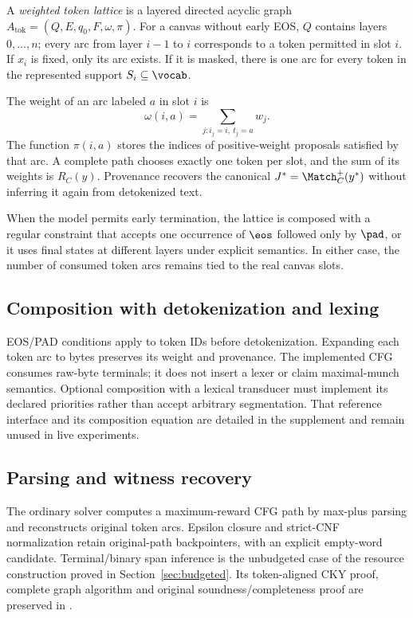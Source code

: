 A \emph{weighted token lattice} is a layered directed acyclic graph $A_{\mathrm{tok}}=(Q,E,q_0,F,\omega,\pi)$. For a canvas without early EOS, $Q$ contains layers $0,\ldots,n$; every arc from layer $i-1$ to $i$ corresponds to a token permitted in slot $i$. If $x_i$ is fixed, only its arc exists. If it is masked, there is one arc for every token in the represented support $S_i\subseteq\vocab$.

The weight of an arc labeled $a$ in slot $i$ is
\begin{equation}
\omega(i,a)=\sum_{j:i_j=i,\ t_j=a}w_j.
\end{equation}
The function $\pi(i,a)$ stores the indices of positive-weight proposals satisfied by that arc. A complete path chooses exactly one token per slot, and the sum of its weights is $R_C(y)$. Provenance recovers the canonical $J^*=\Match_C^+(y^*)$ without inferring it again from detokenized text.

When the model permits early termination, the lattice is composed with a regular constraint that accepts one occurrence of $\eos$ followed only by $\pad$, or it uses final states at different layers under explicit semantics. In either case, the number of consumed token arcs remains tied to the real canvas slots.

\subsection{Composition with detokenization and lexing}

EOS/PAD conditions apply to token IDs before detokenization. Expanding each token arc to bytes preserves its weight and provenance. The implemented CFG consumes raw-byte terminals; it does not insert a lexer or claim maximal-munch semantics. Optional composition with a lexical transducer must implement its declared priorities rather than accept arbitrary segmentation. That reference interface and its composition equation are detailed in the supplement and remain unused in live experiments.

\subsection{Parsing and witness recovery}

The ordinary solver computes a maximum-reward CFG path by max-plus parsing and reconstructs original token arcs. Epsilon closure and strict-CNF normalization retain original-path backpointers, with an explicit empty-word candidate. Terminal/binary span inference is the unbudgeted case of the resource construction proved in Section~\ref{sec:budgeted}. Its token-aligned CKY proof, complete graph algorithm and original soundness/completeness proof are preserved in .

